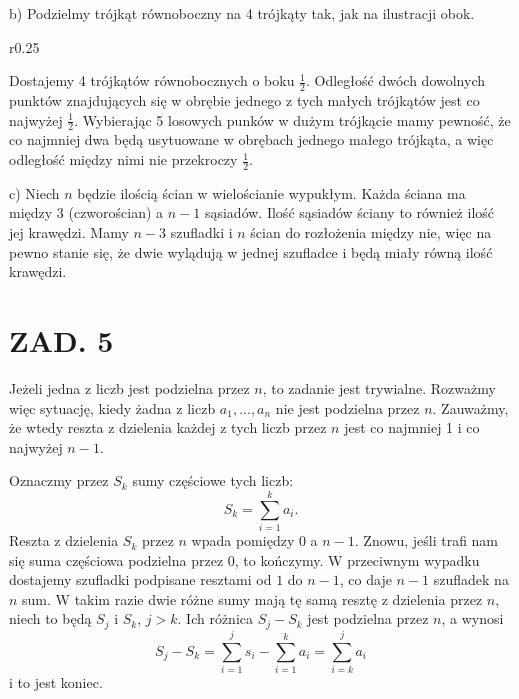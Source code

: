 \documentclass{article}[13pt]
\begin{document}
{\color{acc}b)} Podzielmy trójkąt równoboczny na 4 trójkąty tak, jak na ilustracji obok.
\begin{wrapfigure}{r}{0.25\textwidth}
\end{wrapfigure}
Dostajemy 4 trójkątów równobocznych o boku $\frac12$. Odległość dwóch dowolnych punktów znajdujących się w obrębie jednego z tych małych trójkątów jest co najwyżej $\frac12$. Wybierając 5 losowych punków w dużym trójkącie mamy pewność, że co najmniej dwa będą usytuowane w obrębach jednego małego trójkąta, a więc odległość między nimi nie przekroczy $\frac12$.
\medskip

{\color{acc}c)} Niech $n$ będzie ilością ścian w wielościanie wypukłym. Każda ściana ma między $3$ (czworościan) a $n-1$ sąsiadów. Ilość sąsiadów ściany to również ilość jej krawędzi. Mamy $n-3$ szufladki i $n$ ścian do rozłożenia między nie, więc na pewno stanie się, że dwie wylądują w jednej szufladce i będą miały równą ilość krawędzi.

\section*{ZAD. 5}

Jeżeli jedna z liczb jest podzielna przez $n$, to zadanie jest trywialne. Rozważmy więc sytuację, kiedy żadna z liczb $a_1,..., a_n$ nie jest podzielna przez $n$. Zauważmy, że wtedy reszta z dzielenia każdej z tych liczb przez $n$ jest co najmniej 1 i co najwyżej $n-1$.
\smallskip

Oznaczmy przez $S_k$ sumy częściowe tych liczb:
$$S_k=\sum\limits_{i=1}^k a_i.$$
Reszta z dzielenia $S_k$ przez $n$ wpada pomiędzy $0$ a $n-1$. Znowu, jeśli trafi nam się suma częściowa podzielna przez $0$, to kończymy. W przeciwnym wypadku dostajemy szufladki podpisane resztami od $1$ do $n-1$, co daje $n-1$ szufladek na $n$ sum. W takim razie dwie różne sumy mają tę samą resztę z dzielenia przez $n$, niech to będą $S_j$ i $S_k$, $j>k$. Ich różnica $S_j-S_k$ jest podzielna przez $n$, a wynosi
$$S_j-S_k=\sum\limits_{i=1}^js_i-\sum\limits_{i=1}^ka_i=\sum\limits_{i=k}^ja_i$$
i to jest koniec.
\end{document}

